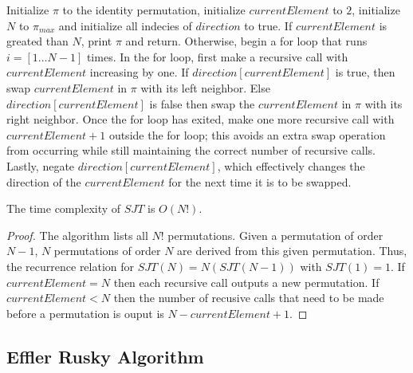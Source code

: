 Initialize $\pi$ to the identity permutation, initialize $currentElement$ to $2$, initialize 
$N$ to $\pi_{max}$ and initialize all indecies of $direction$ to true. If $currentElement$ is greated than $N$, print $\pi$ 
and return. Otherwise, begin a for loop that runs $i=[1 \dots N-1]$ times. 
In the for loop, first make a recursive call with $currentElement$ increasing by one. 
If $direction[currentElement]$ is true, then swap $currentElement$ in $\pi$ with its left neighbor. Else 
$direction[currentElement]$ is false then swap the $currentElement$ in $\pi$ with its right neighbor.
Once the for loop has exited, make one more recursive call with $currentElement+1$ outside the for loop; 
this avoids an extra swap operation from occurring while still maintaining the correct number of recursive 
calls. Lastly, negate $direction[currentElement]$, which effectively changes the direction of the $currentElement$ 
for the next time it is to be swapped.

\begin{lemma}
    The time complexity of $SJT$ is $O(N!)$.
\end{lemma}
\begin{proof}
    The algorithm lists all $N!$ permutations. Given a permutation of order $N-1$,
    $N$ permutations of order $N$ are derived from this given permutation. Thus, the recurrence relation for $SJT(N)=N(SJT(N-1))$ with $SJT(1)=1$. 
    If $currentElement = N$ then each recursive call outputs a new permutation. If $currentElement < N$ then the number of 
    recusive calls that need to be made before a permutation is ouput is $N-currentElement+1$.
\end{proof}



\subsection{Effler Rusky Algorithm}


